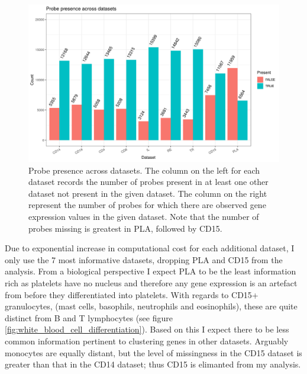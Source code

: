 \documentclass[12pt]{article} %
\begin{document}
	\begin{figure}
		\centering
		\includegraphics[scale=0.9 ]{Images/Data_inspection/probe_presence_across_datasets_no_all.png}
		\caption{Probe presence across datasets. The column on the left for each dataset records the number of probes present in at least one other dataset not present in the given dataset. The column on the right represent the number of probes for which there are observed gene expression values  in the given dataset. Note that the number of probes missing is greatest in PLA, followed by CD15.}
		\label{fig:probe_presence_across_datasets}
	\end{figure}
	
	
	Due to exponential increase in computational cost for each additional dataset, I only use the 7 most informative datasets, dropping PLA and CD15 from the analysis. From a biological perspective I expect PLA to be the least information rich as platelets have no nucleus \citep{Wrighthistogenesisbloodplatelets1910} and therefore any gene expression is an artefact from before they differentiated into platelets. With regards to CD15+ granulocytes, (mast cells, basophils, neutrophils and eosinophils), these are quite distinct from B and T lymphocytes (see figure \ref{fig:white_blood_cell_differentiation}). Based on this I expect there to be less common information pertinent to clustering genes in other datasets. Arguably monocytes are equally distant, but the level of missingness in the CD15 dataset is greater than that in the CD14 dataset; thus CD15 is elimanted from my analysis.
\end{document}
